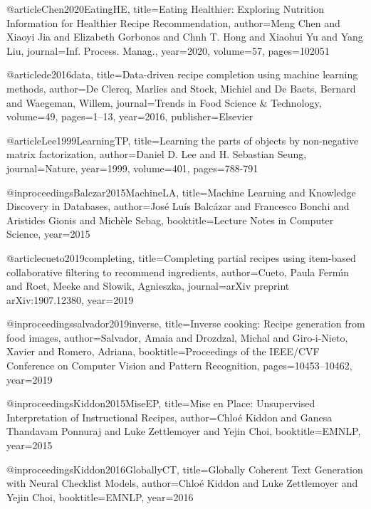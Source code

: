 @article{Chen2020EatingHE,
  title={Eating Healthier: Exploring Nutrition Information for Healthier Recipe Recommendation},
  author={Meng Chen and Xiaoyi Jia and Elizabeth Gorbonos and Chnh T. Hong and Xiaohui Yu and Yang Liu},
  journal={Inf. Process. Manag.},
  year={2020},
  volume={57},
  pages={102051}
}


@article{de2016data,
  title={Data-driven recipe completion using machine learning methods},
  author={De Clercq, Marlies and Stock, Michiel and De Baets, Bernard and Waegeman, Willem},
  journal={Trends in Food Science \& Technology},
  volume={49},
  pages={1--13},
  year={2016},
  publisher={Elsevier}
}


@article{Lee1999LearningTP,
  title={Learning the parts of objects by non-negative matrix factorization},
  author={Daniel D. Lee and H. Sebastian Seung},
  journal={Nature},
  year={1999},
  volume={401},
  pages={788-791}
}

@inproceedings{Balczar2015MachineLA,
  title={Machine Learning and Knowledge Discovery in Databases},
  author={Jos{\'e} Lu{\'i}s Balc{\'a}zar and Francesco Bonchi and Aristides Gionis and Mich{\`e}le Sebag},
  booktitle={Lecture Notes in Computer Science},
  year={2015}
}


@article{cueto2019completing,
  title={Completing partial recipes using item-based collaborative filtering to recommend ingredients},
  author={Cueto, Paula Ferm{\'\i}n and Roet, Meeke and S{\l}owik, Agnieszka},
  journal={arXiv preprint arXiv:1907.12380},
  year={2019}
}




@inproceedings{salvador2019inverse,
  title={Inverse cooking: Recipe generation from food images},
  author={Salvador, Amaia and Drozdzal, Michal and Giro-i-Nieto, Xavier and Romero, Adriana},
  booktitle={Proceedings of the IEEE/CVF Conference on Computer Vision and Pattern Recognition},
  pages={10453--10462},
  year={2019}
}


@inproceedings{Kiddon2015MiseEP,
  title={Mise en Place: Unsupervised Interpretation of Instructional Recipes},
  author={Chlo{\'e} Kiddon and Ganesa Thandavam Ponnuraj and Luke Zettlemoyer and Yejin Choi},
  booktitle={EMNLP},
  year={2015}
}

@inproceedings{Kiddon2016GloballyCT,
  title={Globally Coherent Text Generation with Neural Checklist Models},
  author={Chlo{\'e} Kiddon and Luke Zettlemoyer and Yejin Choi},
  booktitle={EMNLP},
  year={2016}
}

